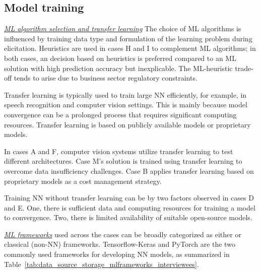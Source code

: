 \subsection{Model training}

\underline{\emph{ML algorithm selection and transfer learning}}
The choice of ML algorithms is influenced by training data type and formulation of the learning problem during \DIFdelbegin {}\DIFdelend \DIFaddbegin {}\DIFaddend elicitation. Heuristics are used in cases H and I to complement ML algorithms; in both cases, an \DIFdelbegin {}\DIFdelend \DIFaddbegin {}\DIFaddend decision based on heuristics is preferred compared to an ML solution with high prediction accuracy but inexplicable. The ML-heuristic trade-off tends to arise due to business sector regulatory constraints.

Transfer learning is typically used to train large NN efficiently, for example, in speech recognition and computer vision settings. This is mainly because model convergence can be a prolonged process that requires significant computing resources. Transfer learning is based on publicly available models or proprietary models.

In cases A and F, computer vision systems utilize transfer learning to test different \DIFdelbegin {}\DIFdelend \DIFaddbegin {}\DIFaddend architectures. Case M's \DIFdelbegin {}\DIFdelend \DIFaddbegin {}\DIFaddend solution is trained using transfer learning to overcome data insufficiency challenges. Case B applies transfer learning based on proprietary models as a cost management strategy. 

Training NN without transfer learning can be \DIFdelbegin {}\DIFdelend \DIFaddbegin {}\DIFaddend by two factors observed in cases D and E. One, there is sufficient data and computing resources for training a model to convergence. Two, there is limited availability of suitable open-source models.

\underline{\emph{ML frameworks}}
used across the cases can be broadly categorized as either \DIFdelbegin {}\DIFdelend \DIFaddbegin {}\DIFaddend or classical (non-NN) frameworks. Tensorflow-Keras and PyTorch are the two commonly used frameworks for developing NN models, as summarized in  Table~\ref{tab:data_source_storage_mlframeworks_interviewees}.

